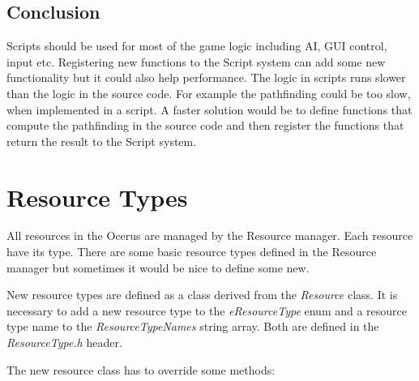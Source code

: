 \documentclass[a4paper, 12pt]{report}
\begin{document}
\section{Conclusion}
Scripts should be used for most of the game logic including AI, GUI control, input etc.
Registering new functions to the Script system can add some new functionality but it could also help performance. The logic in scripts runs slower than the logic in the source code. For example the pathfinding could be too slow, when implemented in a script. A faster solution would be to define functions that compute the pathfinding in the source code and then register the functions that return the result to the Script system.


\chapter{Resource Types}

All resources in the Ocerus are managed by the Resource manager. Each resource have its type. There are some basic resource types defined in the Resource manager but sometimes it would be nice to define some new.

New resource types are defined as a class derived from the \emph{Resource} class. It is necessary to add a new resource type to the \emph{eResourceType} enum and a resource type name to the \emph{ResourceTypeNames} string array. Both are defined in the \emph{ResourceType.h} header.

The new resource class has to override some methods:
\end{document}
